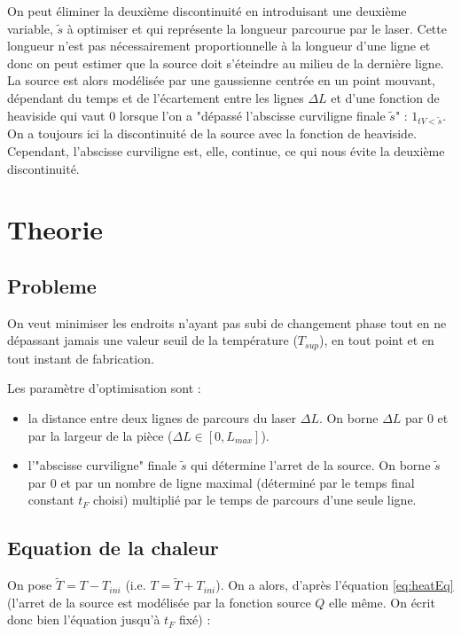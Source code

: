 \documentclass[11pt,a4paper]{article}
\begin{document}
On peut éliminer la deuxième discontinuité en introduisant une deuxième variable, $\tilde{s}$ à optimiser et qui représente la longueur parcourue par le laser. Cette longueur n'est pas nécessairement proportionnelle à la longueur d'une ligne et donc on peut estimer que la source doit s'éteindre au milieu de la dernière ligne. La source est alors modélisée par une gaussienne centrée en un point mouvant, dépendant du temps et de l'écartement entre les lignes $\Delta L$ et d'une fonction de heaviside qui vaut 0 lorsque l'on a "dépassé l'abscisse curviligne finale $\tilde{s}$" : $1_{tV<\tilde{s}}$. On a toujours ici la discontinuité de la source avec la fonction de heaviside. Cependant, l'abscisse curviligne est, elle, continue, ce qui nous évite la deuxième discontinuité.


\section*{Theorie}
\subsection*{Probleme}

On veut minimiser les endroits n'ayant pas subi de changement phase tout en ne dépassant jamais une valeur seuil de la température ($T_{sup}$), en tout point et en tout instant de fabrication.

Les paramètre d'optimisation sont :
\begin{itemize}
	\item la distance entre deux lignes de parcours du laser $\Delta L$. On borne $\Delta L$ par 0 et par la largeur de la pièce ($\Delta L\in[0,L_{max}]$).
	\item l'"abscisse curviligne" finale $\tilde{s}$ qui détermine l'arret de la source. On borne $\tilde{s}$ par 0 et par un nombre de ligne maximal (déterminé par le temps final constant $t_F$ choisi) multiplié par le temps de parcours d'une seule ligne.
\end{itemize}
 
\subsection*{Equation de la chaleur}

On pose $\tilde{T}=T-T_{ini}$ (i.e. $T=\tilde{T}+T_{ini}$). On a alors, d'après l'équation \ref{eq:heatEq} (l'arret de la source est modélisée par la fonction source $Q$ elle même. On écrit donc bien l'équation jusqu'à $t_F$ fixé) :
\end{document}
